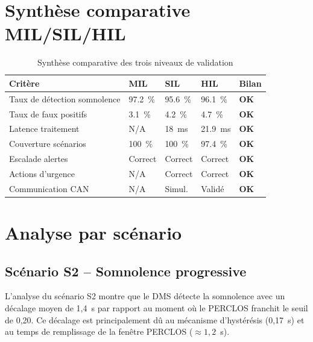 \documentclass[12pt,a4paper]{report}
\begin{document}
\section{Synth\`ese comparative MIL/SIL/HIL}

\begin{table}[H]
\centering
\caption{Synth\`ese comparative des trois niveaux de validation}
\label{tab:synthesis}
\begin{tabular}{L{3.5cm} C{2.5cm} C{2.5cm} C{2.5cm} C{1.5cm}}
\toprule
\textbf{Crit\`ere} & \textbf{MIL} & \textbf{SIL} & \textbf{HIL} & \textbf{Bilan} \\
\midrule
Taux de d\'etection somnolence & 97.2~\% & 95.6~\% & 96.1~\% & \textcolor{green!60!black}{\textbf{OK}} \\
Taux de faux positifs & 3.1~\% & 4.2~\% & 4.7~\% & \textcolor{green!60!black}{\textbf{OK}} \\
Latence traitement & N/A & 18~ms & 21.9~ms & \textcolor{green!60!black}{\textbf{OK}} \\
Couverture sc\'enarios & 100~\% & 100~\% & 97.4~\% & \textcolor{green!60!black}{\textbf{OK}} \\
Escalade alertes & Correct & Correct & Correct & \textcolor{green!60!black}{\textbf{OK}} \\
Actions d'urgence & N/A & Correct & Correct & \textcolor{green!60!black}{\textbf{OK}} \\
Communication CAN & N/A & Simul. & Valid\'e & \textcolor{green!60!black}{\textbf{OK}} \\
\bottomrule
\end{tabular}
\end{table}

\section{Analyse par sc\'enario}

\subsection{Sc\'enario S2 -- Somnolence progressive}

L'analyse du sc\'enario S2 montre que le DMS d\'etecte la somnolence avec un d\'ecalage moyen de 1{,}4~s par rapport au moment o\`u le PERCLOS franchit le seuil de 0{,}20. Ce d\'ecalage est principalement d\^u au m\'ecanisme d'hyst\'er\'esis (0{,}17~s) et au temps de remplissage de la fen\^etre PERCLOS ($\approx 1{,}2$~s).
\end{document}
